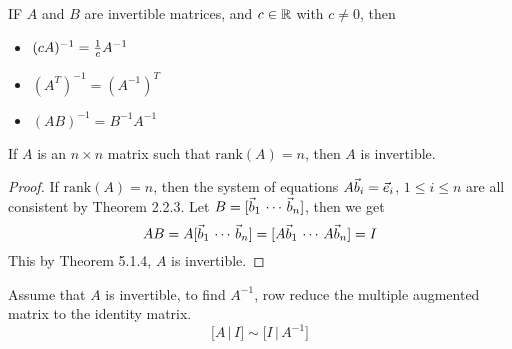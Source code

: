 \documentclass[english, 12pt]{article}
\begin{document}
\begin{thrm}
IF $A$ and $B$ are invertible matrices, and $c \in {\mathbb{R}}$ with $c \neq 0$, then
\begin{itemize}
\item $(cA)^{-1} = \frac{1}{c} A^{-1}$
\item $(A^T)^{-1} = (A^{-1})^T$
\item $(AB)^{-1} = B^{-1}A^{-1}$
\end{itemize}
\end{thrm}

\begin{thrm}
If $A$ is an $n \times n$ matrix such that $\text{rank}(A) = n$, then $A$ is invertible.
\begin{proof}
If $\text{rank}(A) = n$, then the system of equations $A\vec{b}_i = \vec{e}_i$, $1 \leq i \leq n$ are all consistent by Theorem 2.2.3. Let $B = \lbrack \vec{b}_1 \,\cdots\,\vec{b}_n \rbrack$, then we get
\[AB = A\lbrack \vec{b}_1 \,\cdots\,\vec{b}_n \rbrack = \lbrack A\vec{b}_1 \,\cdots\,A\vec{b}_n \rbrack = I\]
This by Theorem 5.1.4, $A$ is invertible.
\end{proof}
\end{thrm}

\begin{mthd}
Assume that $A$ is invertible, to find $A^{-1}$, row reduce the multiple augmented matrix to the identity matrix.
\[\lbrack A\,|\,I\rbrack \sim \lbrack I \,|\,A^{-1} \rbrack\]
\end{mthd}
\end{document}
